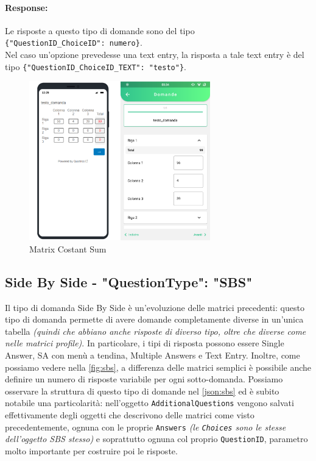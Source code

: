 \paragraph{Response:}
Le risposte a questo tipo di domande sono del tipo\\ \texttt{\{"QuestionID\_ChoiceID": numero\}}.\\Nel caso un'opzione prevedesse una text entry, la risposta a tale text entry è del tipo \texttt{\{"QuestionID\_ChoiceID\_TEXT": "testo"\}}.

\begin{figure}[h!]
\centering
\includegraphics[width=0.7\textwidth]{img/matrix_cs}
\caption{Matrix Costant Sum}
\label{fig:matrix_cs}
\end{figure}

\clearpage
\subsection{Side By Side - "QuestionType": "SBS"}
Il tipo di domanda Side By Side è un'evoluzione delle matrici precedenti: questo tipo di domanda permette di avere domande completamente diverse in un'unica tabella \textit{(quindi che abbiano anche risposte di diverso tipo, oltre che diverse come nelle matrici profile)}. In particolare, i tipi di risposta possono essere Single Answer, SA con menù a tendina, Multiple Answers e Text Entry. Inoltre, come possiamo vedere nella \autoref{fig:sbs}, a differenza delle matrici semplici è possibile anche definire un numero di risposte variabile per ogni sotto-domanda. Possiamo osservare la struttura di questo tipo di domande nel \autoref{json:sbs} ed è subito notabile una particolarità: nell'oggetto \texttt{AdditionalQuestions} vengono salvati effettivamente degli oggetti che descrivono delle matrici come visto precedentemente, ognuna con le proprie \texttt{Answers} \textit{(le \texttt{Choices} sono le stesse dell'oggetto SBS stesso)} e soprattutto ognuna col proprio \texttt{QuestionID}, parametro molto importante per costruire poi le risposte.


